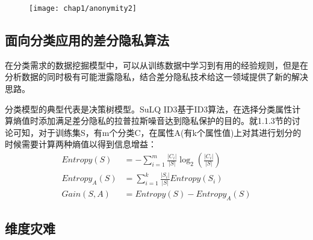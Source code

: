 \begin{figure}[!htp]
	\centering
	\texttt{[image: chap1/anonymity2]}
\end{figure}

\subsection{面向分类应用的差分隐私算法}  %

在分类需求的数据挖掘模型中，可以从训练数据中学习到有用的经验规则，但是在分析数据的同时极有可能泄露隐私，结合差分隐私技术给这一领域提供了新的解决思路。

分类模型的典型代表是决策树模型。SuLQ ID3\cite{SuLQ}基于ID3算法，在选择分类属性计算熵值时添加满足差分隐私的拉普拉斯噪音达到隐私保护的目的。就1.1.3节的讨论可知，对于训练集S，有m个分类C，在属性A(有k个属性值)上对其进行划分的时候需要计算两种熵值以得到信息增益：
\[
\begin{split}
	Entropy(S) &= -\sum_{i=1}^{m}\frac{|C_{i}|}{|S|}\log_{2}(\frac{|C_{i}|}{|S|})\\
	Entropy_{A}(S) &= \sum_{i=1}^{k}\frac{|S_{i}|}{|S|}Entropy(S_{i})\\
	Gain(S,A) &= Entropy(S)-Entropy_{A}(S)
\end{split}	
\]

\subsection{维度灾难}